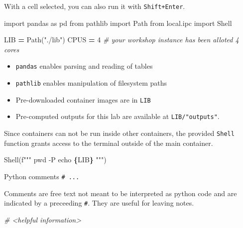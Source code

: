\documentclass[
]{book}
\newenvironment{Shaded}{\begin{snugshade}}{\end{snugshade}}
\newcommand{\CommentTok}[1]{\textcolor[rgb]{0.56,0.35,0.01}{\textit{#1}}}
\newcommand{\DecValTok}[1]{\textcolor[rgb]{0.00,0.00,0.81}{#1}}
\newcommand{\ImportTok}[1]{#1}
\newcommand{\NormalTok}[1]{#1}
\newcommand{\OperatorTok}[1]{\textcolor[rgb]{0.81,0.36,0.00}{\textbf{#1}}}
\newcommand{\SpecialCharTok}[1]{\textcolor[rgb]{0.81,0.36,0.00}{\textbf{#1}}}
\newcommand{\SpecialStringTok}[1]{\textcolor[rgb]{0.31,0.60,0.02}{#1}}
\newcommand{\StringTok}[1]{\textcolor[rgb]{0.31,0.60,0.02}{#1}}
\providecommand{\tightlist}{%
  \setlength{\itemsep}{0pt}\setlength{\parskip}{0pt}}
\begin{document}
With a cell selected, you can also run it with \texttt{Shift+Enter}.

\begin{Shaded}
\begin{Highlighting}[numbers=left,,]
\ImportTok{import}\NormalTok{ pandas }\ImportTok{as}\NormalTok{ pd}
\ImportTok{from}\NormalTok{ pathlib }\ImportTok{import}\NormalTok{ Path}
\ImportTok{from}\NormalTok{ local.ipc }\ImportTok{import}\NormalTok{ Shell}

\NormalTok{LIB }\OperatorTok{=}\NormalTok{ Path(}\StringTok{"./lib"}\NormalTok{)}
\NormalTok{CPUS }\OperatorTok{=} \DecValTok{4} \CommentTok{\# your workshop instance has been alloted 4 cores}
\end{Highlighting}
\end{Shaded}

\begin{itemize}
\tightlist
\item
  \texttt{pandas} enables parsing and reading of tables
\item
  \texttt{pathlib} enables manipulation of filesystem paths
\item
  Pre-downloaded container images are in \texttt{LIB}
\item
  Pre-computed outputs for this lab are available at \texttt{LIB/"outputs"}.
\end{itemize}

Since containers can not be run inside other containers,
the provided \texttt{Shell} function grants access to the terminal outside of the main container.

\begin{Shaded}
\begin{Highlighting}[numbers=left,,]
\NormalTok{Shell(}\SpecialStringTok{f"""}
\SpecialStringTok{pwd {-}P}
\SpecialStringTok{echo }\SpecialCharTok{\{}\NormalTok{LIB}\SpecialCharTok{\}}
\SpecialStringTok{"""}\NormalTok{)}
\end{Highlighting}
\end{Shaded}

Python comments \texttt{\#\ ...}

Comments are free text not meant to be interpreted as python code and are indicated by a preceeding \texttt{\#}.
They are useful for leaving notes.

\begin{Shaded}
\begin{Highlighting}[numbers=left,,]
\CommentTok{\# \textless{}helpful information\textgreater{}}
\end{Highlighting}
\end{Shaded}
\end{document}
